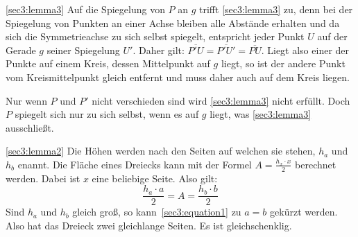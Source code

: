 \documentclass[10pt, a4paper, reqno]{amsart}
\makeatletter
\renewcommand\proofname{Beweis}
\renewenvironment{proof}[1][\proofname]{\par
\pushQED{\qed}%
\normalfont \topsep6\p@\@plus6\p@\relax
\trivlist
\item\relax
{\bfseries#1}\hspace\labelsep\ignorespaces
}{%
\popQED\endtrivlist\@endpefalse
}
\newenvironment{proof_thm}[1]{
\begin{proof}[\proofname~(#1)]}{\end{proof}}
\makeatother
\begin{document}
\begin{proof_thm}{\autoref{sec3:lemma3}}
  Auf die Spiegelung von $P$ an $g$ trifft \autoref{sec3:lemma3} zu, denn bei
  der Spiegelung von Punkten an einer Achse bleiben alle Abstände erhalten und
  da sich die Symmetrieachse zu sich selbst spiegelt, entspricht jeder Punkt $U$
  auf der Gerade $g$ seiner Spiegelung $U'$. Daher gilt: $\overline{P'U} =
  \overline{P'U'} = \overline{PU}$. Liegt also einer der Punkte auf einem Kreis,
  dessen Mittelpunkt auf $g$ liegt, so ist der andere Punkt vom Kreismittelpunkt
  gleich entfernt und muss daher auch auf dem Kreis liegen.

  Nur wenn $P$ und $P'$ nicht verschieden sind wird \autoref{sec3:lemma3} nicht
  erfüllt. Doch $P$ spiegelt sich nur zu sich selbst, wenn es auf $g$ liegt, was
  \autoref{sec3:lemma3} ausschließt.
\end{proof_thm}
\begin{proof_thm}{\autoref{sec3:lemma2}}
  Die Höhen werden nach den Seiten auf welchen sie stehen, $h_a$ und $h_b$
  enannt. Die Fläche eines Dreiecks kann mit der Formel $A=\frac{h_x\cdot x}{2}$
  berechnet werden. Dabei ist $x$ eine beliebige Seite. Also gilt:
  \begin{equation}\label{sec3:equation1}
    \frac{h_a\cdot a}{2}=A=\frac{h_b\cdot b}{2}
  \end{equation}
  Sind $h_a$ und $h_b$ gleich groß, so kann~\eqref{sec3:equation1} zu $a=b$
  gekürzt werden. Also hat das Dreieck zwei gleichlange Seiten. Es ist
  gleichschenklig.
\end{proof_thm}
\end{document}
